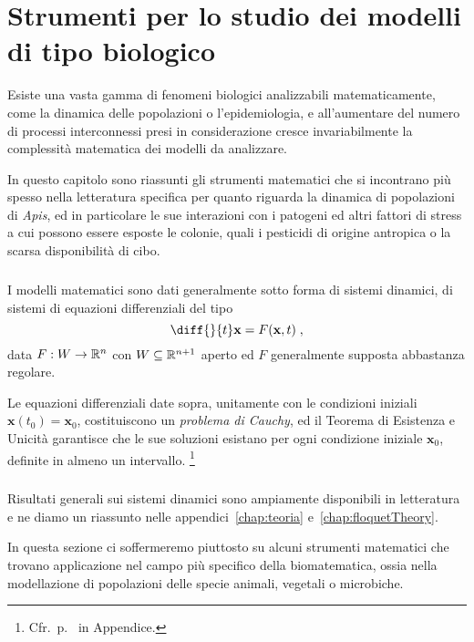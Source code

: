 \chapter[Strumenti per i modelli biologici]{Strumenti per lo studio dei modelli di tipo biologico}
\label{sec:ingredientiBioMat}

Esiste una vasta gamma di fenomeni biologici analizzabili matematicamente, come la dinamica delle popolazioni
o l'epidemiologia, e all'aumentare del numero di processi interconnessi presi in considerazione cresce
invariabilmente la complessità matematica dei modelli da analizzare.

In questo capitolo sono riassunti gli strumenti matematici che si incontrano più spesso nella letteratura
specifica per quanto riguarda la dinamica di popolazioni di \emph{Apis}, ed in particolare le sue interazioni
con i patogeni ed altri fattori di stress a cui possono essere esposte le colonie, quali i pesticidi di
origine antropica o la scarsa disponibilità di cibo.

\paragraph{}
I modelli matematici sono dati generalmente sotto forma di sistemi dinamici, \ie di sistemi di equazioni
differenziali del tipo
\begin{equation}
    \diff{}{t} \mathbf{x} = F( \mathbf{x}, t ) \; ,
    \label{eq:sistDin}
\end{equation}
data $F: W \to \mathbb{R}^n$ con $W \subseteq \mathbb{R}^{n+1}$ aperto ed $F$ generalmente supposta abbastanza regolare.

Le equazioni differenziali date sopra, unitamente con le condizioni iniziali $\mathbf{x} (t_0) = \mathbf{x}_0$,
costituiscono un \emph{problema di Cauchy}, ed il Teorema di Esistenza e Unicità garantisce che le sue soluzioni
esistano per ogni condizione iniziale $\mathbf{x}_0$, definite in almeno un intervallo.
\footnote{Cfr.~p.~\pageref{eq:sdcGenerale} in Appendice.}

\paragraph{}
Risultati generali sui sistemi dinamici sono ampiamente disponibili in letteratura e ne diamo un riassunto
nelle appendici~\ref{chap:teoria} e~\ref{chap:floquetTheory}.

In questa sezione ci soffermeremo piuttosto su alcuni strumenti matematici che trovano applicazione nel campo
più specifico della biomatematica, ossia nella modellazione di popolazioni delle specie animali, vegetali
o microbiche.

